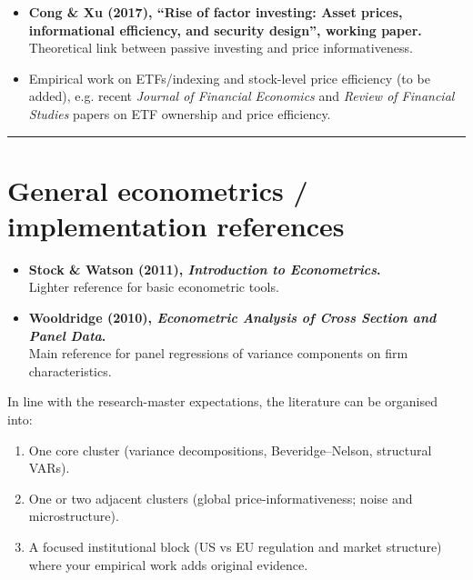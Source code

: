 \documentclass[11pt,a4paper]{article}
\begin{document}
\begin{itemize}
  \item \textbf{Cong \& Xu (2017), ``Rise of factor investing: Asset prices, informational efficiency, and security design'', working paper.}\\
  Theoretical link between passive investing and price informativeness.

  \item Empirical work on ETFs/indexing and stock-level price efficiency (to be added), e.g. recent \emph{Journal of Financial Economics} and \emph{Review of Financial Studies} papers on ETF ownership and price efficiency.
\end{itemize}

\bigskip
\hrule
\bigskip

\section{General econometrics / implementation references}

\begin{itemize}
  \item \textbf{Stock \& Watson (2011), \emph{Introduction to Econometrics}.}\\
  Lighter reference for basic econometric tools.

  \item \textbf{Wooldridge (2010), \emph{Econometric Analysis of Cross Section and Panel Data}.}\\
  Main reference for panel regressions of variance components on firm characteristics.
\end{itemize}

\bigskip
\noindent
In line with the research-master expectations, the literature can be organised into:
\begin{enumerate}
  \item One core cluster (variance decompositions, Beveridge--Nelson, structural VARs).
  \item One or two adjacent clusters (global price-informativeness; noise and microstructure).
  \item A focused institutional block (US vs EU regulation and market structure) where your empirical work adds original evidence.
\end{enumerate}
\end{document}

